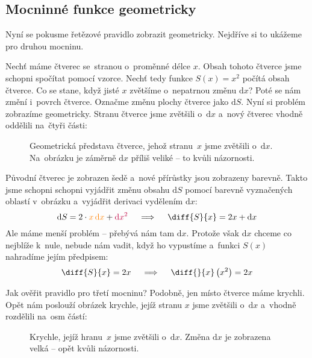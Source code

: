 \subsection{Mocninné funkce geometricky}

Nyní se pokusme řetězové pravidlo zobrazit geometricky. Nejdříve si to ukážeme pro
druhou mocninu.

Nechť máme čtverec se~stranou o~proměnné délce $x$. Obsah tohoto čtverce jsme schopni
spočítat pomocí vzorce. Nechť tedy funkce $S(x) = x^2$ počítá obsah čtverce. Co se
stane, když jisté $x$ zvětšíme o~nepatrnou změnu $\text{d}x$? Poté se nám změní
i~povrch čtverce. Označme změnu plochy čtverce jako $\text{d}S$. Nyní si problém
zobrazíme geometricky. Stranu čtverce jsme zvětšili o~$\text{d}x$ a~nový čtverec
vhodně oddělili na~čtyři části:

\begin{figure}[H]
    \centering
    
    \caption{
        Geometrická představa čtverce, jehož stranu~$x$ jsme zvětšili
        o~$\text{d}x$. Na~obrázku je záměrně $\text{d}x$ příliš veliké -- to kvůli
        názornosti.
    }
\end{figure}

Původní čtverec je zobrazen šedě a~nové přírůstky jsou zobrazeny barevně. Takto jsme
schopni schopni vyjádřit změnu obsahu $\text{d}S$ pomocí barevně vyznačených oblastí
v~obrázku a~vyjádřit derivaci vydělením $\text{d}x$:
\begin{equation*}
    \text{d}S = 2 \cdot {\color{orange} x \, \text{d}x} + {\color{purple} \text{d}x^2} \quad \implies \quad
    \diff{S}{x} = 2x + \text{d}x
\end{equation*}
Ale máme menší problém -- přebývá nám tam $\text{d}x$. Protože však $\text{d}x$
chceme co nejblíže k~nule, nebude nám vadit, když ho vypustíme a~funkci $S(x)$
nahradíme jejím předpisem:
\begin{equation*}
    \diff{S}{x} = 2x \quad \implies\quad
    \diff{}{x} \left( x^2 \right) = 2x
\end{equation*}

Jak ověřit pravidlo pro třetí mocninu? Podobně, jen místo čtverce máme krychli. Opět
nám poslouží obrázek krychle, jejíž stranu $x$ jsme zvětšili o~$\text{d}x$ a~vhodně
rozdělili na~osm částí:

\begin{figure}[!ht]
    \centering
    
    \caption{Krychle, jejíž hranu~$x$ jsme zvětšili o~$\text{d}x$. Změna $\text{d}x$
    je zobrazena velká -- opět kvůli názornosti.}
\end{figure}


